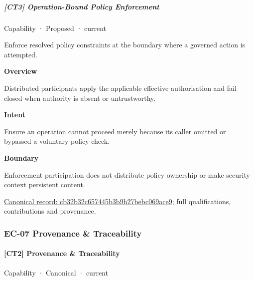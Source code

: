 \subparagraph{[CT3] Operation-Bound Policy Enforcement}

\label{element:cb32b32c657445b3b9b27bebc069ace9}
{\small Capability · Proposed · current}\par

Enforce resolved policy constraints at the boundary where a governed action is attempted.



\textbf{Overview}



Distributed participants apply the applicable effective authorisation and fail closed when authority is absent or untrustworthy.



\textbf{Intent}



Ensure an operation cannot proceed merely because its caller omitted or bypassed a voluntary policy check.



\textbf{Boundary}



Enforcement participation does not distribute policy ownership or make security context persistent content.


{\footnotesize \href{../../../../continuum/strategy/capability/cb32b32c657445b3b9b27bebc069ace9.md}{Canonical record: cb32b32c657445b3b9b27bebc069ace9}; full qualifications, contributions and provenance.}\par
\subsubsection{EC-07 Provenance \& Traceability}

\paragraph{[CT2] Provenance \& Traceability}

\label{element:68a0755aa4e14a509ac5e6c0bbcff3e7}
{\small Capability · Canonical · current}\par

